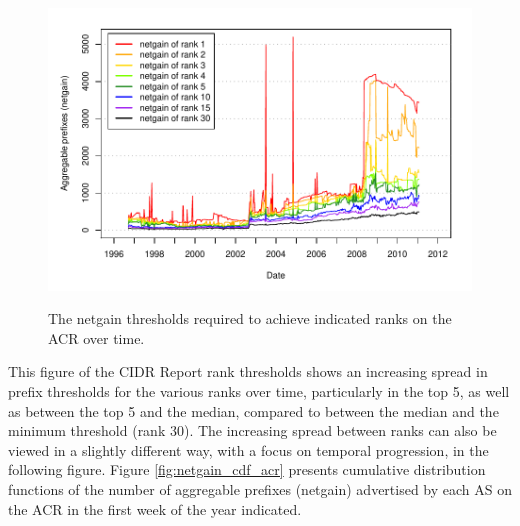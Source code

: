 \begin{figure}[h!]
\begin{centering}
\begin{singlespace}
    \includegraphics[width=6in]{figures/acr_netgain_time.pdf}
    \vspace{-2em}\\
    \caption{The netgain thresholds required to achieve indicated ranks on the
    ACR over time.}
    \label{fig:thresholds}
    \end{singlespace}
\end{centering}
\end{figure}

This figure of the CIDR Report rank thresholds shows an increasing spread in
prefix thresholds for the various ranks over time, particularly in the top 5,
as well as between the top 5 and the median, compared to between the median and
the minimum threshold (rank 30). The increasing spread between ranks can also
be viewed in a slightly different way, with a focus on temporal progression, in
the following figure. Figure \ref{fig:netgain_cdf_acr} presents cumulative
distribution functions of the number of aggregable prefixes (netgain)
advertised by each AS on the ACR in the first week of the year indicated.

